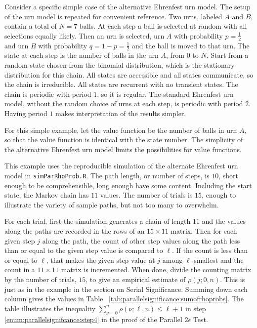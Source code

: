 \documentclass[12pt]{article}
\begin{document}
\begin{example}
    Consider a specific simple case of the alternative Ehrenfest urn
    model.%
    The setup of the urn model is repeated for convenient reference.
    Two urns, labeled \( A \) and \( B \), contain a total of \( N = 7 \)
    balls.  At each step a ball is selected at random with all
    selections equally likely.  Then an urn is selected, urn \( A \)
    with probability \( p = \frac{1}{2} \) and urn \( B \) with
    probability \( q = 1-p = \frac {1}{2} \) and the ball is moved to
    that urn.  The state at each step is the number of balls in the urn \(
    A \), from \( 0 \) to \( N \).  Start from a random state chosen
    from the binomial distribution, which is the stationary distribution
    for this chain.  All states are accessible and all states
    communicate, so the chain is irreducible.  All states are recurrent
    with no transient states.  The chain is periodic with period \( 1 \),
    so it is regular.  The standard Ehrenfest urn model, without the
    random choice of urns at each step, is periodic with period \( 2 \).
    Having period \( 1 \) makes interpretation of the results simpler.

    For this simple example, let the value function be the number of
    balls in urn \( A \), so that the value function is identical with
    the state number.  The simplicity of the alternative Ehrenfest urn
    model limits the possibilities for value functions.

    This example uses the reproducible simulation of the alternate
    Ehrenfest urn model in \texttt{simParRhoProb.R}.  The path length,
    or number of steps, is \( 10 \), short enough to be comprehensible,
    long enough have some content.  Including the start state, the
    Markov chain has \( 11 \) values.  The number of trials is \( 15 \),
    enough to illustrate the variety of sample paths, but not too many
    to overwhelm.

    For each trial, first the simulation generates a chain of length \(
    11 \) and the values along the paths are recorded in the rows of an \(
    15 \times 11 \) matrix.  Then for each given step \( j \) along the
    path, the count of other step values along the path less than or
    equal to the given step value is compared to \( \ell \).  If the
    count is less than or equal to \( \ell \), that makes the given step
    value at \( j \) among-\( \ell \)-smallest and the count in a \( 11
    \times 11 \) matrix is incremented.  When done, divide the counting
    matrix by the number of trials, \( 15 \), to give an empirical
    estimate of \( \rho(j; 0 ,n) \).  This is just as in the example in
    the section on Serial Significance.  Summing down each column gives
    the values in Table~%
    \ref{tab:parallelsignificance:sumofrhoprobs}.  The table illustrates
    the inequality \( \sum_{\nu=0}^n \rho (\nu; \ell, n) \le \ell + 1 \)
    in step~%
    \ref{enum:parallelsignifcance:step4} in the proof of the Parallel \(
    2 \epsilon \) Test.


\end{example}
\end{document}
